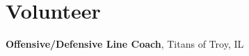 \documentclass[]{TTurner}
\begin{document}
\begin{minipage}[t]{0.25\textwidth}

\section{Volunteer} 
{\textbf{Offensive/Defensive Line Coach}, Titans of Troy, IL}






\end{minipage} 
\end{document}
